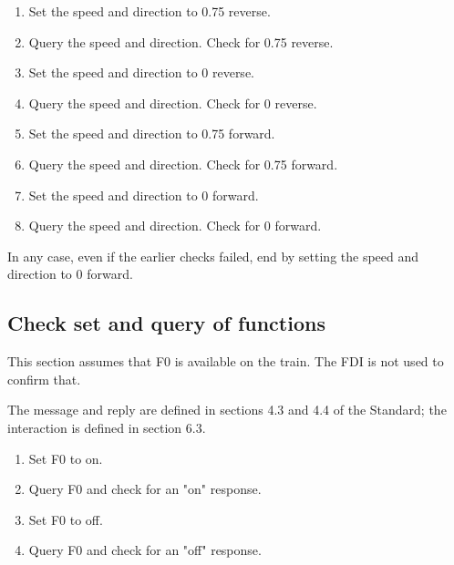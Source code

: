 \begin{enumerate}

    \item Set the speed and direction to 0.75 reverse.

    \item Query the speed and direction. Check for 0.75 reverse.

    \item Set the speed and direction to 0 reverse.

    \item Query the speed and direction. Check for 0 reverse.

    \item Set the speed and direction to 0.75 forward.

    \item Query the speed and direction. Check for 0.75 forward.

    \item Set the speed and direction to 0 forward.

    \item Query the speed and direction. Check for 0 forward.

\end{enumerate}

In any case, even if the earlier checks failed, end by setting the speed 
and direction to 0 forward.

\subsection{Check set and query of functions}

This section assumes that F0 is available on the train.
The FDI is not used to confirm that.

The message and reply are defined in sections 4.3 and 4.4 of the Standard;
the interaction is defined in section 6.3.

\begin{enumerate}

    \item Set F0 to on.

    \item Query F0 and check for an "on" response.

    \item Set F0 to off.

    \item Query F0 and check for an "off" response.

\end{enumerate}

